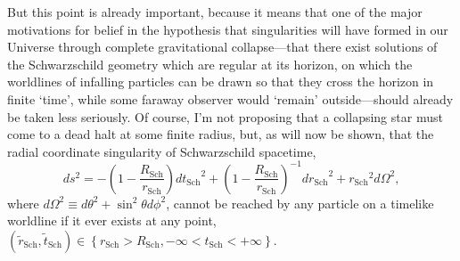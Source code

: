 But this point is already important, because it means that one of the major motivations for belief in the hypothesis that singularities will have formed in our Universe through complete gravitational collapse---that there exist solutions of the Schwarzschild geometry which are regular at its horizon, on which the worldlines of infalling particles can be drawn so that they cross the horizon in finite `time', while some faraway observer would `remain' outside---should already be taken less seriously. Of course, I'm not proposing that a collapsing star must come to a dead halt at some finite radius, but, as will now be shown, that the radial coordinate singularity of Schwarzschild spacetime,
\begin{equation}
ds^2=-\left(1-\frac{R_{\mathrm{Sch}}}{r_{\mathrm{Sch}}}\right){dt_{\mathrm{Sch}}}^2+\left(1-\frac{R_{\mathrm{Sch}}}{r_{\mathrm{Sch}}}\right)^{-1}{dr_{\mathrm{Sch}}}^2+{r_{\mathrm{Sch}}}^2d\Omega^2,\label{Sch_stat}
\end{equation} 
where $d\Omega^2\equiv{d\theta^2+\sin^2\theta{d\phi^2}}$, cannot be reached by any particle on a timelike worldline if it ever exists at any point, $(\tilde{r}_{\mathrm{Sch}},\tilde{t}_{\mathrm{Sch}})\in\left\{r_{\mathrm{Sch}}>R_{\mathrm{Sch}}, -\infty<t_{\mathrm{Sch}}<+\infty\right\}$.

